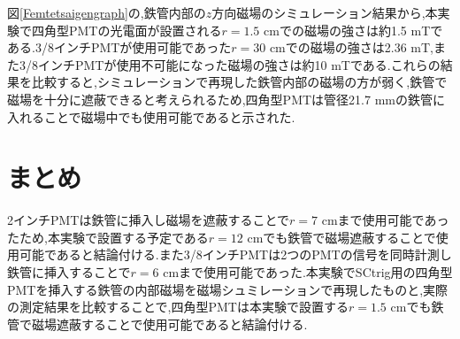 図\ref{Femtetsaigengraph}の,鉄管内部の$z$方向磁場のシミュレーション結果から,本実験で四角型PMTの光電面が設置される$r=1.5$ cmでの磁場の強さは約1.5 mTである.3/8インチPMTが使用可能であった$r=30$ cmでの磁場の強さは2.36 mT,また3/8インチPMTが使用不可能になった磁場の強さは約10 mTである.これらの結果を比較すると,シミュレーションで再現した鉄管内部の磁場の方が弱く,鉄管で磁場を十分に遮蔽できると考えられるため,四角型PMTは管径21.7 mmの鉄管に入れることで磁場中でも使用可能であると示された.

\section{まとめ}
2インチPMTは鉄管に挿入し磁場を遮蔽することで$r=7$ cmまで使用可能であったため,本実験で設置する予定である$r=12$ cmでも鉄管で磁場遮蔽することで使用可能であると結論付ける.また3/8インチPMTは2つのPMTの信号を同時計測し鉄管に挿入することで$r=6$ cmまで使用可能であった.本実験でSCtrig用の四角型PMTを挿入する鉄管の内部磁場を磁場シュミレーションで再現したものと,実際の測定結果を比較することで,四角型PMTは本実験で設置する$r=1.5$ cmでも鉄管で磁場遮蔽することで使用可能であると結論付ける.



